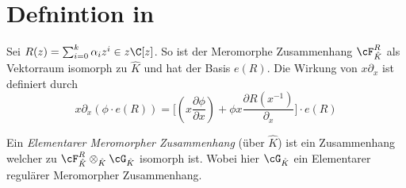 \section{Defnintion in \cite{sabbah_cimpa90}}
\begin{comment}
in \cite{sabbah_cimpa90} Teil 5.4.4 Seite 34
\end{comment}
\begin{defn}
Sei $R(z)=\sum_{i=0}^k\alpha_iz^i\in z\C[z]$.
So ist der Meromorphe Zusammenhang $\cF_{\hat K}^R$ als Vektorraum isomorph zu
$\hat K$ und hat der Basis $e(R)$.
Die Wirkung von $x\partial_x$ ist definiert durch
\[
x\partial_x(\phi\cdot e(R))=\Big[ (x\frac{\partial \phi}{\partial x}) 
  +\phi x \frac{\partial R(x^{-1})}{\partial_x} \Big]\cdot e(R)
\]
\begin{comment}
hat das was mit fourier zu tun
\end{comment}
\begin{comment}
This means that $e(R)$ plays the role of $\exp R(x^{-1})$.
\end{comment}
\end{defn}
\begin{defn}
Ein \emph{Elementarer Meromorpher Zusammenhang} (über $\hat K$) ist ein Zusammenhang
welcher zu 
$\cF_{\hat K}^R\otimes_{\hat K} \cG_{\hat K}$
isomorph ist. Wobei hier $\cG_{\hat K}$ ein Elementarer regulärer Meromorpher
Zusammenhang.
\end{defn}

